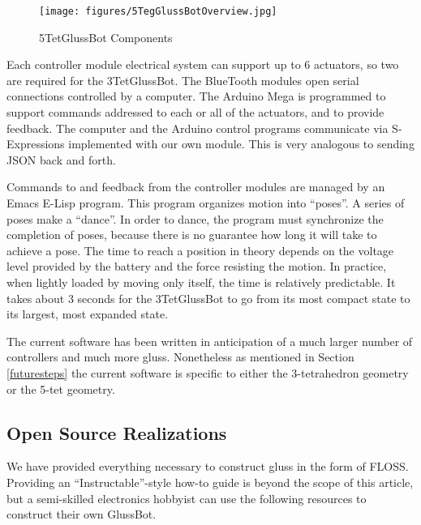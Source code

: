 \documentclass[11pt]{article}
\begin{document}
\begin{figure}[H]
  \centering
    \texttt{[image: figures/5TegGlussBotOverview.jpg]}
    \caption[5TetGlussBot Components]{5TetGlussBot Components}
      \label{5TetGlussBot}
\end{figure}


Each controller module electrical system can support up to 6 actuators, so two are required for the 3TetGlussBot.
The BlueTooth modules open serial connections controlled by a computer.
The Arduino Mega is programmed to support commands addressed to each or all of the actuators, and
to provide feedback. The computer and the Arduino control programs communicate via S-Expressions
implemented with our own module. This is very analogous to sending JSON back and forth.

Commands to and feedback from the controller modules are managed by an Emacs E-Lisp program.
This program organizes motion into ``poses''. A series of poses make a ``dance''.
In order to dance, the program must synchronize the completion of poses, because there is no
guarantee how long it will take to achieve a pose. The time to reach a position in theory
depends on the voltage level provided by the battery and the force resisting the motion.
In practice, when lightly loaded by moving only itself, the time is relatively predictable. It takes
about 3 seconds for the 3TetGlussBot to go from its most compact state to its largest, most expanded state.

The current software has been written in anticipation of a much larger number of controllers and much more gluss.
Nonetheless as mentioned in Section \ref{futuresteps} the current software is specific to either the 3-tetrahedron geometry or the
5-tet geometry.


\subsection{Open Source Realizations}

We have provided everything necessary to construct gluss in the form of FLOSS. Providing an ``Instructable''-style
how-to guide is beyond the scope of this article, but a semi-skilled electronics hobbyist can use the
following resources to construct their own GlussBot.
\end{document}
